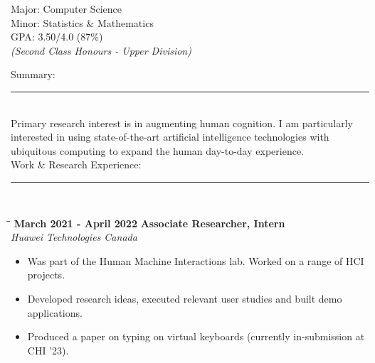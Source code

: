 \documentclass[a4paper,10pt]{article}
\begin{document}
{\begin{minipage}[t]{0.33\textwidth}
\begin{tabbing}
      \> \>  \> {\small Major: Computer Science} \\
      \> \>  \> {\small Minor: Statistics \& Mathematics} \\
      \> \>  \> {\small GPA: 3.50/4.0 (87\%)}\\
      \> \>  \> {\small \emph{(Second Class Honours - Upper Division)}}
    \end{tabbing}
  \end{minipage}
  \hspace{20pt}
  \begin{minipage}[t]{0.60\textwidth}
    \color{black!80}
    \small
    {\large Summary:}\vspace{-0.2cm}\\
    \rule{0.75\textwidth}{0.4pt}
    \vspace{0.1cm}\\
    {\small Primary research interest is in augmenting human cognition. I
    am particularly interested in using state-of-the-art artificial
    intelligence technologies with ubiquitous computing to expand the
    human day-to-day experience. }
    \vspace{0.5cm}\\
    {\large Work \& Research Experience:}\vspace{-0.2cm}\\
    \rule{0.75\textwidth}{0.4pt}
    \vspace{-0.6cm}\\
    \begin{tabbing}
      \=\hspace*{6cm}\=\hspace*{5cm}\= \kill
      \>\textbf{ March 2021 - April 2022} \> \textbf{Associate Researcher, Intern}\\\>\> \emph{Huawei Technologies Canada}
    \end{tabbing}
    \vspace{-0.4cm}
    \begin{itemize}
      \setlength\itemsep{-0.1pt}
    \item Was part of the Human Machine Interactions lab. Worked on a range of HCI projects.
    \item Developed research ideas, executed relevant user studies and built demo applications.
    \item Produced a paper on typing on virtual keyboards (currently in-submission at CHI '23).

\end{itemize}
\end{minipage}}
\end{document}
